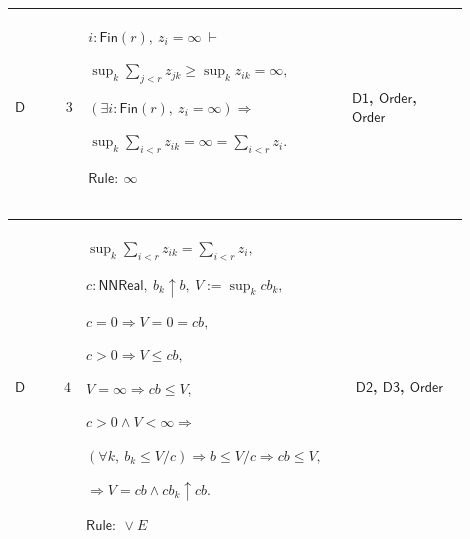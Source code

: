 \documentclass[12pt,reqno]{amsart}
\theoremstyle{blueplain}
\numberwithin{equation}{section}
\begin{document}
{\scriptsize \setlength{\parskip}{0pt}\nointerlineskip
\noindent 
\begin{tabular}{|@{}>{\centering\arraybackslash}m{0.10658\linewidth}|>{\centering\arraybackslash}m{0.03553\linewidth}|>{\centering\arraybackslash}m{0.52105\linewidth}|>{\centering\arraybackslash}m{0.23684\linewidth}|}
\hline
\hypertarget{proof:D3}{$\displaystyle \mathsf{D}$} & $\displaystyle 3$ & $%
\displaystyle i:\mathsf{Fin}(r),\ z_i=\infty\ \vdash$\par$\displaystyle %
\sup_k\sum_{j<r}z_{jk}\ge\sup_kz_{ik}=\infty,$\par$\displaystyle (\exists i:%
\mathsf{Fin}(r),\ z_i=\infty)\Rightarrow$\par$\displaystyle %
\sup_k\sum_{i<r}z_{ik}=\infty=\sum_{i<r}z_i.$\par$\displaystyle \mathsf{Rule}%
:\ \infty$ & \hyperlink{proof:D1}{$\displaystyle \mathsf{D1}$}, \hyperlink{lem:Order}%
{$\displaystyle \mathsf{Order}$}, \hyperlink{ax:Order}{$\displaystyle 
\mathsf{Order}$} \\ \hline
\end{tabular}%
}

{\scriptsize \setlength{\parskip}{0pt}\nointerlineskip
\noindent 
\begin{tabular}{|@{}>{\centering\arraybackslash}m{0.10658\linewidth}|>{\centering\arraybackslash}m{0.03553\linewidth}|>{\centering\arraybackslash}m{0.52105\linewidth}|>{\centering\arraybackslash}m{0.23684\linewidth}|}
\hline
\hypertarget{proof:D4}{$\displaystyle \mathsf{D}$} & $\displaystyle 4$ & $%
\displaystyle \sup_k\sum_{i<r}z_{ik}=\sum_{i<r}z_i,$\par$\displaystyle c:%
\mathsf{NNReal},\ b_k\uparrow b,\ V:=\sup_k cb_k,$\par$\displaystyle %
c=0\Rightarrow V=0=cb,$\par$\displaystyle c>0\Rightarrow V\le cb,$\par$%
\displaystyle V=\infty\Rightarrow cb\le V,$\par$\displaystyle c>0\land
V<\infty\Rightarrow$\par$\displaystyle (\forall k,\ b_k\le V/c)\Rightarrow
b\le V/c\Rightarrow cb\le V,$\par$\displaystyle \Rightarrow V=cb\land
cb_k\uparrow cb.$\par$\displaystyle \mathsf{Rule}:\ \lor E$ & \hyperlink{proof:D2}%
{$\displaystyle \mathsf{D2}$}, \hyperlink{proof:D3}{$\displaystyle \mathsf{D3%
}$}, \hyperlink{ax:Order}{$\displaystyle \mathsf{Order}$} \\ \hline
\end{tabular}%
}
\end{document}
